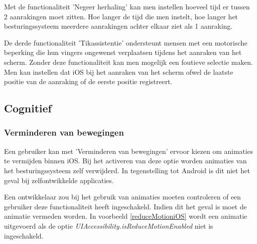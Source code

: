 Met de functionaliteit 'Negeer herhaling' kan men instellen hoeveel tijd er tussen 2 aanrakingen moet zitten. Hoe langer de tijd die men instelt, hoe langer het besturingssysteem meerdere aanrakingen achter elkaar ziet als 1 aanraking.


De derde functionaliteit 'Tikassistentie' ondersteunt mensen met een motorische beperking die hun vingers ongewenst verplaatsen tijdens het aanraken van het scherm. Zonder deze functionaliteit kan men mogelijk een foutieve selectie maken. Men kan instellen dat iOS bij het aanraken van het scherm ofwel de laatste positie van de aanraking of de eerste positie registreert.

\subsection{Cognitief}
\subsubsection{Verminderen van bewegingen}
Een gebruiker kan met 'Verminderen van bewegingen' ervoor kiezen om animaties te vermijden binnen iOS. Bij het activeren van deze optie worden animaties van het besturingssysteem zelf verwijderd. In tegenstelling tot Android is dit niet het geval bij zelfontwikkelde applicaties.



Een ontwikkelaar zou bij het gebruik van animaties moeten controleren of een gebruiker deze functionaliteit heeft ingeschakeld. Indien dit het geval is moet de animatie vermeden worden. In voorbeeld \ref{reduceMotioniOS} wordt een animatie uitgevoerd als de optie \emph{UIAccessibility.isReduceMotionEnabled} niet is ingeschakeld.

